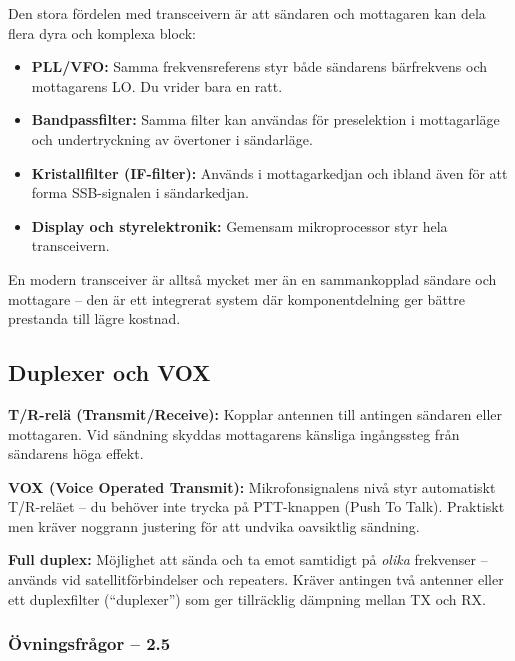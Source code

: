 \documentclass[a4paper,11pt,twoside]{book}
\newcommand{\emoji}[1]{{\emojifont #1}}
\begin{document}
Den stora fördelen med transceivern är att sändaren och mottagaren
kan dela flera dyra och komplexa block:

\begin{bluebox}[title={\emoji{🔑} Delade komponenter i en transceiver}]
\begin{itemize}
  \item \textbf{PLL/VFO:} Samma frekvensreferens styr både sändarens
        bärfrekvens och mottagarens LO. Du vrider bara en ratt.
  \item \textbf{Bandpassfilter:} Samma filter kan användas för
        preselektion i mottagarläge och undertryckning av övertoner
        i sändarläge.
  \item \textbf{Kristallfilter (IF-filter):} Används i mottagarkedjan
        och ibland även för att forma SSB-signalen i sändarkedjan.
  \item \textbf{Display och styrelektronik:}
        Gemensam mikroprocessor styr hela transceivern.
\end{itemize}

En modern transceiver är alltså mycket mer än en sammankopplad
sändare och mottagare -- den är ett integrerat system där
komponentdelning ger bättre prestanda till lägre kostnad.
\end{bluebox}

\subsection{Duplexer och VOX}

\begin{bluebox}[title={\emoji{🔑} TX/RX-växling}]
\textbf{T/R-relä (Transmit/Receive):} Kopplar antennen till antingen
sändaren eller mottagaren. Vid sändning skyddas mottagarens känsliga
ingångssteg från sändarens höga effekt.

\medskip
\textbf{VOX (Voice Operated Transmit):} Mikrofonsignalens nivå
styr automatiskt T/R-reläet -- du behöver inte trycka på PTT-knappen
(Push To Talk). Praktiskt men kräver noggrann justering för att
undvika oavsiktlig sändning.

\medskip
\textbf{Full duplex:} Möjlighet att sända och ta emot samtidigt
på \emph{olika} frekvenser -- används vid satellitförbindelser
och repeaters. Kräver antingen två antenner eller ett duplexfilter
(``duplexer'') som ger tillräcklig dämpning mellan TX och RX.
\end{bluebox}

\subsubsection*{Övningsfrågor -- 2.5}
\end{document}
